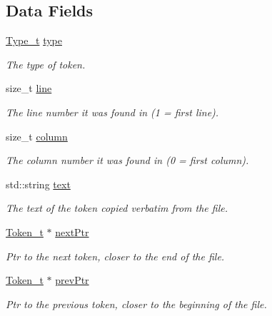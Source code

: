 \subsection*{Data Fields}
\begin{DoxyCompactItemize}
\item 
\hyperlink{structparse_tree_1_1_token__t_ac0e6319a9ad80509dd4aa1037ba66096}{Type\+\_\+t} \hyperlink{structparse_tree_1_1_token__t_a97c48431de51258f22ffda5d53c0b76d}{type}
\begin{DoxyCompactList}\small\item\em The type of token. \end{DoxyCompactList}\item 
size\+\_\+t \hyperlink{structparse_tree_1_1_token__t_aeb6e84ac89c0e31766abba0a7a48d87e}{line}
\begin{DoxyCompactList}\small\item\em The line number it was found in (1 = first line). \end{DoxyCompactList}\item 
size\+\_\+t \hyperlink{structparse_tree_1_1_token__t_aa335cf1451637a8c7d7f40aeb6ef0b05}{column}
\begin{DoxyCompactList}\small\item\em The column number it was found in (0 = first column). \end{DoxyCompactList}\item 
std\+::string \hyperlink{structparse_tree_1_1_token__t_a69704002442dc464b54b106424ddc47d}{text}
\begin{DoxyCompactList}\small\item\em The text of the token copied verbatim from the file. \end{DoxyCompactList}\item 
\hyperlink{structparse_tree_1_1_token__t}{Token\+\_\+t} $\ast$ \hyperlink{structparse_tree_1_1_token__t_a873fefba3212c3c25197fefc85083bf6}{next\+Ptr}
\begin{DoxyCompactList}\small\item\em Ptr to the next token, closer to the end of the file. \end{DoxyCompactList}\item 
\hyperlink{structparse_tree_1_1_token__t}{Token\+\_\+t} $\ast$ \hyperlink{structparse_tree_1_1_token__t_a0277c3588dab5bf1a26c0ae60169918d}{prev\+Ptr}
\begin{DoxyCompactList}\small\item\em Ptr to the previous token, closer to the beginning of the file. \end{DoxyCompactList}\end{DoxyCompactItemize}
